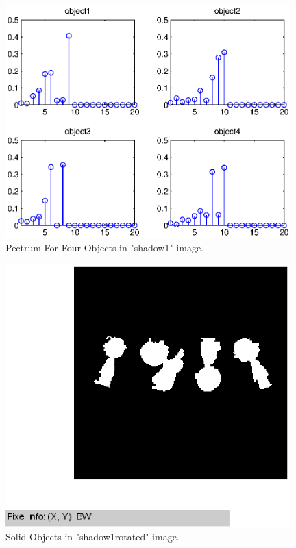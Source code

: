 \documentclass[paper=a4, fontsize=11pt]{scrartcl}
\begin{document}
\begin{figure}
	\centering
	\includegraphics[width=11cm]{pecstrum_for_4objectinshadow1.eps}
	\caption{ Pectrum For Four Objects in "shadow1" image. }
	\label{fig:25}
\end{figure}

\begin{figure}
	\centering
	\includegraphics[width=11cm]{shadow1rotated_solidpart.eps}
	\caption{ Solid Objects in "shadow1rotated" image. }
	\label{fig:26}
\end{figure}
\end{document}
